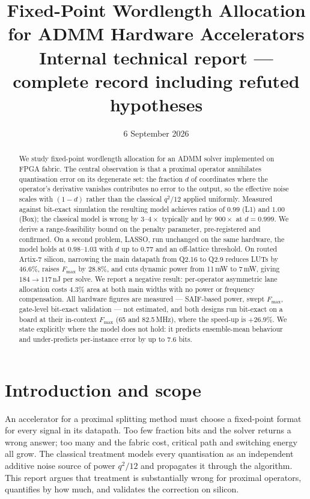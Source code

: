 \documentclass[11pt,a4paper]{article}
\title{Fixed-Point Wordlength Allocation for ADMM Hardware Accelerators\\
       \large Internal technical report --- complete record including
       refuted hypotheses}
\author{}
\date{6 September 2026}
\begin{document}
\maketitle

\begin{abstract}
We study fixed-point wordlength allocation for an ADMM solver implemented on
FPGA fabric. The central observation is that a proximal operator annihilates
quantisation error on its degenerate set: the fraction $d$ of coordinates where
the operator's derivative vanishes contributes no error to the output, so the
effective noise scales with $(1-d)$ rather than the classical $q^2/12$ applied
uniformly. Measured against bit-exact simulation the resulting model achieves
ratios of $0.99$ (L1) and $1.00$ (Box); the classical model is wrong by
$3\text{--}4\times$ typically and by $900\times$ at $d = 0.999$. We derive a
range-feasibility bound on the penalty parameter, pre-registered and confirmed.
On a second problem, LASSO, run unchanged on the same hardware, the model
holds at $0.98$--$1.03$ with $d$ up to $0.77$ and an off-lattice threshold.
On routed Artix-7 silicon, narrowing the main datapath from Q2.16 to Q2.9
reduces LUTs by $46.6\%$, raises $F_{\max}$ by $28.8\%$, and cuts dynamic power
from 11\,mW to 7\,mW, giving $184 \to 117$\,nJ per solve. We report a negative
result: per-operator asymmetric lane allocation costs $4.3\%$ area at both main
widths with no power or frequency compensation. All hardware figures are
measured --- SAIF-based power, swept $F_{\max}$, gate-level bit-exact
validation --- not estimated, and both designs run bit-exact on a board at
their in-context $F_{\max}$ (65 and 82.5\,MHz), where the speed-up is
$+26.9\%$. We state explicitly where the model does not
hold: it predicts ensemble-mean behaviour and under-predicts per-instance error
by up to $7.6$ bits.
\end{abstract}

\tableofcontents
\newpage

\section{Introduction and scope}

An accelerator for a proximal splitting method must choose a fixed-point format
for every signal in its datapath. Too few fraction bits and the solver returns
a wrong answer; too many and the fabric cost, critical path and switching
energy all grow. The classical treatment models every quantisation as an
independent additive noise source of power $q^2/12$ and propagates it through
the algorithm. This report argues that treatment is substantially wrong for
proximal operators, quantifies by how much, and validates the correction on
silicon.
\end{document}
